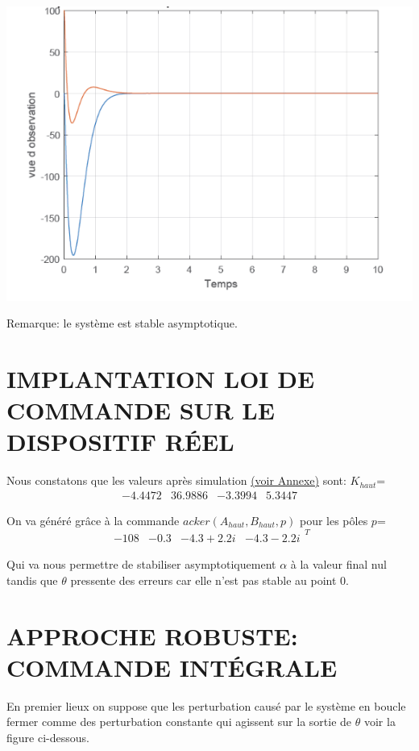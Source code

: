 \documentclass[12pt, a4paper, openany]{report}
\begin{document}
\begin{center}
{\includegraphics[scale=0.6]{fig10.png}} 
\label{fiig10}
\end{center} 

Remarque: le système est stable asymptotique.

\chapter{IMPLANTATION LOI DE COMMANDE SUR LE DISPOSITIF RÉEL}
     
     Nous constatons que les valeurs après simulation \hyperref[section1.111]{(voir Annexe)}\label{annexe111} sont:  
    $K_{haut}$=
$$
\begin{matrix}
-4.4472 &  36.9886  & -3.3994 &   5.3447
\end{matrix} 
$$     

     On va généré grâce à la commande $acker(A_{haut},B_{haut},p)$
pour les pôles $p$=
$$
\begin{matrix}
-108&-0.3&-4.3+2.2i&-4.3-2.2i
\end{matrix}^{T}
$$

     Qui va nous permettre  de stabiliser asymptotiquement $\alpha$ à la valeur final nul tandis que $\theta$ pressente des erreurs car elle n'est pas  stable au point  0.
     
\chapter{APPROCHE ROBUSTE: COMMANDE INTÉGRALE}
     En premier lieux on suppose que les perturbation causé par le système en boucle fermer comme des perturbation constante qui agissent sur la sortie de $\theta$ voir la figure ci-dessous.  
     
\end{document}
